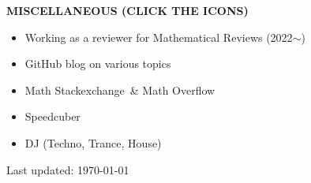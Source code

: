 \documentclass[letterpaper,11pt]{article}
\newcommand{\resheading}[1]{%
  \par\addvspace{10pt}%
  {\sffamily\bfseries\large\color{accent}\MakeUppercase{#1}}\par\nobreak
  \vspace{2pt}{\color{accent!35}\hrule height 0.7pt}\par\nobreak\vspace{5pt}}
\begin{document}
\resheading{Miscellaneous (click the icons)}
\begin{itemize}
\item Working as a reviewer for Mathematical Reviews (2022$\sim$) \href{https://mathscinet.ams.org/mathscinet/search/publications.html?pg1=RVRI&s1=1266901&pg3=authreviews}{\faExternalLink}
\item GitHub blog on various topics \href{https://seewoo5.github.io/blog/}{\faEdit}
\item Math Stackexchange \href{https://math.stackexchange.com/users/350772/seewoo-lee}{\faStackExchange}\,\& Math Overflow \href{https://mathoverflow.net/users/95471/seewoo-lee}{\faStackOverflow}
\item Speedcuber\,\,\href{https://www.worldcubeassociation.org/persons/2018LEES06}{\faCube}
\item DJ (Techno, Trance, House)\,\,\href{https://soundcloud.com/aftrmath-dj}{\faSoundcloud}\,\,\href{https://www.youtube.com/channel/UCv2LsKzh8sdzXeMWa99dn_A}{\faYoutube}
\end{itemize}

\vfill
{\hfill\sffamily\footnotesize\color{muted}Last updated: \today}
\end{document}
